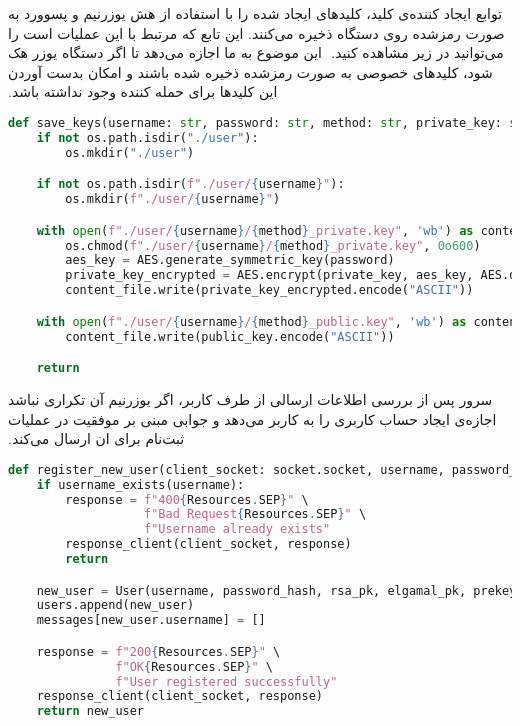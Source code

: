 ‫توابع ایجاد کننده‌ی کلید، کلید‌های ایجاد شده را با استفاده از هش یوزرنیم و پسوورد به صورت رمزشده روی دستگاه ذخیره می‌کنند. این تابع که مرتبط با این عملیات است را می‌توانید در زیر مشاهده کنید.
‫
‫این موضوع به ما اجازه می‌دهد تا اگر دستگاه یوزر هک شود، کلیدهای خصوصی به صورت رمزشده ذخیره شده باشند و امکان بدست آوردن این کلیدها برای حمله کننده وجود نداشته باشد.

\begin{latin}
\begin{lstlisting}[firstnumber=12, language=Python]
def save_keys(username: str, password: str, method: str, private_key: str, public_key: str):
    if not os.path.isdir("./user"):
        os.mkdir("./user")

    if not os.path.isdir(f"./user/{username}"):
        os.mkdir(f"./user/{username}")

    with open(f"./user/{username}/{method}_private.key", 'wb') as content_file:
        os.chmod(f"./user/{username}/{method}_private.key", 0o600)
        aes_key = AES.generate_symmetric_key(password)
        private_key_encrypted = AES.encrypt(private_key, aes_key, AES.default_iv)
        content_file.write(private_key_encrypted.encode("ASCII"))

    with open(f"./user/{username}/{method}_public.key", 'wb') as content_file:
        content_file.write(public_key.encode("ASCII"))

    return
\end{lstlisting}
\end{latin}

‫سرور پس از بررسی اطلاعات ارسالی از طرف کاربر، اگر یوزرنیم آن تکراری نباشد اجازه‌ی ایجاد حساب کاربری را به کاربر می‌دهد و جوابی مبنی بر موفقیت در عملیات ثبت‌نام برای ان ارسال می‌کند.

\begin{latin}
\begin{lstlisting}[firstnumber=73, language=Python]
def register_new_user(client_socket: socket.socket, username, password_hash, rsa_pk, elgamal_pk, prekey_pk):
    if username_exists(username):
        response = f"400{Resources.SEP}" \
                   f"Bad Request{Resources.SEP}" \
                   f"Username already exists"
        response_client(client_socket, response)
        return

    new_user = User(username, password_hash, rsa_pk, elgamal_pk, prekey_pk)
    users.append(new_user)
    messages[new_user.username] = []

    response = f"200{Resources.SEP}" \
               f"OK{Resources.SEP}" \
               f"User registered successfully"
    response_client(client_socket, response)
    return new_user
\end{lstlisting}
\end{latin}

